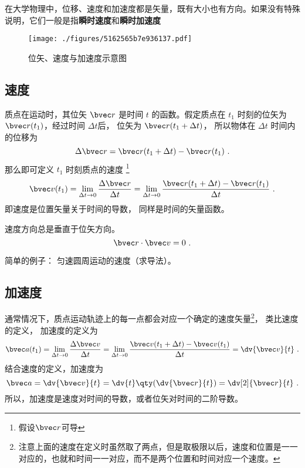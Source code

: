 

在大学物理中，位移、速度和加速度都是矢量，既有大小也有方向。如果没有特殊说明，它们一般是指\textbf{瞬时速度}和\textbf{瞬时加速度}

\begin{figure}[ht]
\centering
\texttt{[image: ./figures/5162565b7e936137.pdf]}
\caption{位矢、速度与加速度示意图} \label{fig_VnA_1}
\end{figure}

\subsection{速度}

质点在运动时，其位矢 $\bvec r$ 是时间 $t$ 的函数。假定质点在 $t_1$ 时刻的位矢为 $\bvec r(t_1)$，经过时间 $\Delta t$后， 位矢为 $\bvec r(t_1 + \Delta t)$， 所以物体在 $\Delta t$ 时间内的位移为
\begin{equation}
\Delta \bvec r = \bvec r (t_1 + \Delta t) - \bvec r (t_1)~.
\end{equation}
那么即可定义 $t_1$ 时刻质点的速度
\footnote{假设$\bvec r$可导}
\begin{equation}
\bvec v(t_1) = \lim_{\Delta t \to 0} \frac{\Delta \bvec r}{\Delta t} = \lim_{\Delta t \to 0} \frac{\bvec r (t_1 + \Delta t) - \bvec r(t_1)}{\Delta t}~.
\end{equation}
即速度是位置矢量关于时间的导数， 同样是时间的矢量函数。

\begin{theorem}{}
速度方向总是垂直于位矢方向。
\begin{equation}
\bvec r \cdot \bvec v = 0~.
\end{equation}
\end{theorem}

简单的例子： 匀速圆周运动的速度（求导法）。

\subsection{加速度}

通常情况下，质点运动轨迹上的每一点都会对应一个确定的速度矢量\footnote{注意上面的速度在定义时虽然取了两点，但是取极限以后，速度和位置是一一对应的，也就和时间一一对应，而不是两个位置和时间对应一个速度。}， 类比速度的定义， 加速度的定义为
\begin{equation}\label{eq_VnA_4}
\bvec a(t_1) = \lim_{\Delta t \to 0} \frac{\Delta \bvec v}{\Delta t}
= \lim_{\Delta t \to 0} \frac{\bvec v(t_1 + \Delta t) - \bvec v (t_1)}{\Delta t} = \dv{\bvec v}{t}~.
\end{equation}
结合速度的定义，加速度为
\begin{equation}
\bvec a = \dv{\bvec v}{t} = \dv{t} \qty( \dv{\bvec r}{t} ) = \dv[2]{\bvec r}{t}~.
\end{equation}
所以，加速度是速度对时间的导数，或者位矢对时间的二阶导数。

